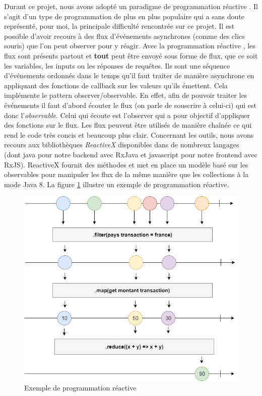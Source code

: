 	Durant ce projet, nous avons adopté un paradigme de programmation réactive \cite{bib_progReac}. Il s'agit d'un type de programmation de plus en plus populaire qui a sans doute représenté, pour moi, la principale difficulté rencontrée sur ce projet. Il est possible d'avoir recours à des flux d'événements asynchrones (comme des clics souris) que l'on peut observer pour y réagir. Avec la programmation réactive \cite{bib_progReac2}, les flux sont présents partout et \textbf{tout} peut être envoyé sous forme de flux, que ce soit les variables, les inputs ou les réponses de requêtes. Ils sont une séquence d'événements ordonnés dans le temps qu'il faut traiter de manière asynchrone en appliquant des fonctions de callback sur les valeurs qu'ils émettent. Cela implémente le pattern observer/observable. En effet, afin de pouvoir traiter les événements il faut d'abord écouter le flux (on parle de souscrire à celui-ci) qui est donc l'\textit{observable}. Celui qui écoute est l'observer qui a pour objectif d'appliquer des fonctions sur le flux. Les flux peuvent être utilisés de manière chaînée ce qui rend le code très concis et beaucoup plus clair. Concernant les outils, nous avons recours aux bibliothèques \textit{ReactiveX} disponibles dans de nombreux langages (dont java pour notre backend avec RxJava et javascript pour notre frontend avec RxJS). ReactiveX fournit des méthodes et met en place un modèle basé sur les observables pour manipuler les flux de la même manière que les collections à la mode Java 8. La figure \ref{reactivex} illustre un exemple de programmation réactive.
	
\begin{figure}[h!]
	\includegraphics[scale=0.50]{images/travailBP1818/architecture/reactivex.png}
	\centering
	\caption{Exemple de programmation réactive}
	\label{reactivex}
\end{figure}

